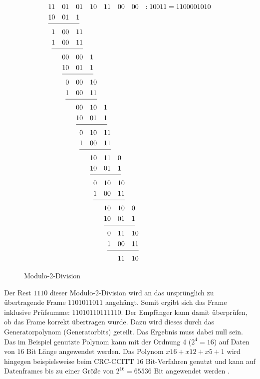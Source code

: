 \begin{figure}[H]
	\jot-0.6mm
	\begin{alignat*}{14}
	1&1&0&1&0&1&1&0&1&1&0&0&0&0& : 10011=1100001010 \\
	1&0&0&1&1\\ \cline{1-5}
	&1&0&0&1&1& \\ 
	&1&0&0&1&1& \\ \cline{2-6}
	&&0&0&0&0&1& \\ 
	&&1&0&0&1&1& \\ \cline{3-7}
	&&&0&0&0&1&0& \\                                                 
	&&&1&0&0&1&1& \\ \cline{4-8}
	&&&&0&0&1&0&1& \\                                               
	&&&&1&0&0&1&1& \\ \cline{5-9}
	&&&&&0&1&0&1&1& \\                                           
	&&&&&1&0&0&1&1&  \\ \cline{6-10}                                                                                  
	&&&&&&1&0&1&1&0& \\                                           
	&&&&&&1&0&0&1&1& \\   \cline{7-11}                                                                                      
	&&&&&&&0&1&0&1&0& \\                                         
	&&&&&&&1&0&0&1&1& \\ \cline{8-12}                                                                                     
	&&&&&&&&1&0&1&0&0& \\                                       
	&&&&&&&&1&0&0&1&1& \\ \cline{9-13}                                                                               
	&&&&&&&&&0&1&1&1&0& \\                                     
	&&&&&&&&&1&0&0&1&1& \\ \cline{10-14}    
	&&&&&&&&&&1&1&1&0& 
	\end{alignat*}
	\caption{Modulo-2-Division} 
\end{figure}

Der Rest $1110$ dieser Modulo-$2$-Division wird an das
urspr{\"u}nglich zu {\"u}bertragende Frame $11 0101 1011$ angeh{\"a}ngt. Somit
ergibt sich das Frame inklusive Pr{\"u}fsumme: $11 0101 1011 1110$. Der
Empf{\"a}nger kann damit {\"u}berpr{\"u}fen, ob das Frame korrekt {\"u}bertragen
wurde. Dazu wird dieses durch das Generatorpolynom (Generatorbits) geteilt.
Das Ergebnis muss dabei null sein. Das im Beispiel genutzte Polynom kann mit der
Ordnung $4$ ($2^4=16$) auf Daten von $16$ Bit Länge angewendet werden. Das
Polynom $x16+x12+x5+1$ wird hingegen beispielsweise beim CRC-CCITT $16$ Bit-Verfahren
genutzt und kann auf Datenframes bis zu einer Gr{\"o}{\ss}e von $2^{16}=65536$
Bit angewendet werden \cite{web2}.

